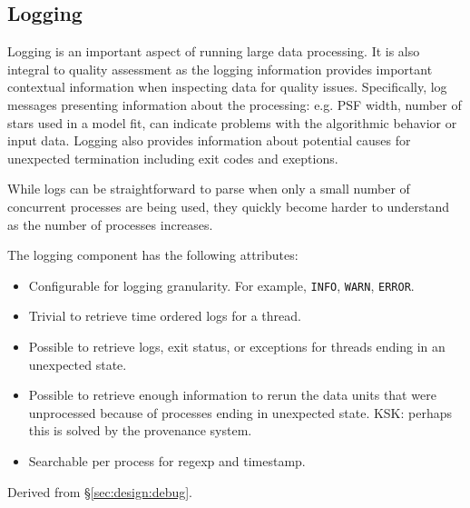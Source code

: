 \subsection{Logging}
\label{sec:comp:log}


Logging is an important aspect of running large data processing.
It is also integral to quality assessment as the logging information provides important contextual information when inspecting data for quality issues.
Specifically, log messages presenting information about the processing: e.g. PSF width, number of stars used in a model fit, can indicate problems with the algorithmic behavior or input data.
Logging also provides information about potential causes for unexpected termination including exit codes and exeptions.

While logs can be straightforward to parse when only a small number of concurrent processes are being used, they quickly become harder to understand as the number of processes increases.

The logging component has the following attributes:
\begin{itemize}
\item Configurable for logging granularity. For example, \texttt{INFO}, \texttt{WARN}, \texttt{ERROR}.
\item Trivial to retrieve time ordered logs for a thread.
\item Possible to retrieve logs, exit status, or exceptions for threads ending in an unexpected state.
\item Possible to retrieve enough information to rerun the data units that were unprocessed because of processes ending in unexpected state.  KSK: perhaps this is solved by the provenance system.
\item Searchable per process for regexp and timestamp.
\end{itemize}

Derived from \S\ref{sec:design:debug}.
